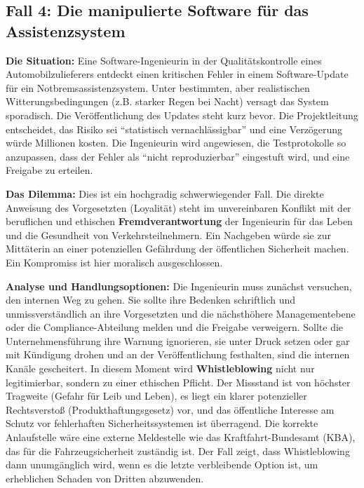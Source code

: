 \documentclass[
    12pt,               %
    a4paper,            %
    ngerman             %
]{scrartcl}
\begin{document}
\subsection{Fall 4: Die manipulierte Software für das Assistenzsystem}

\textbf{Die Situation:} Eine Software-Ingenieurin in der Qualitätskontrolle eines Automobilzulieferers entdeckt einen kritischen Fehler in einem Software-Update für ein Notbremsassistenzsystem. Unter bestimmten, aber realistischen Witterungsbedingungen (z.B. starker Regen bei Nacht) versagt das System sporadisch. Die Veröffentlichung des Updates steht kurz bevor. Die Projektleitung entscheidet, das Risiko sei \enquote{statistisch vernachlässigbar} und eine Verzögerung würde Millionen kosten. Die Ingenieurin wird angewiesen, die Testprotokolle so anzupassen, dass der Fehler als \enquote{nicht reproduzierbar} eingestuft wird, und eine Freigabe zu erteilen.

\textbf{Das Dilemma:} Dies ist ein hochgradig schwerwiegender Fall. Die direkte Anweisung des Vorgesetzten (Loyalität) steht im unvereinbaren Konflikt mit der beruflichen und ethischen \textbf{Fremdverantwortung} der Ingenieurin für das Leben und die Gesundheit von Verkehrsteilnehmern. Ein Nachgeben würde sie zur Mittäterin an einer potenziellen Gefährdung der öffentlichen Sicherheit machen. Ein Kompromiss ist hier moralisch ausgeschlossen.

\textbf{Analyse und Handlungsoptionen:} Die Ingenieurin muss zunächst versuchen, den internen Weg zu gehen. Sie sollte ihre Bedenken schriftlich und unmissverständlich an ihre Vorgesetzten und die nächsthöhere Managementebene oder die Compliance-Abteilung melden und die Freigabe verweigern. Sollte die Unternehmensführung ihre Warnung ignorieren, sie unter Druck setzen oder gar mit Kündigung drohen und an der Veröffentlichung festhalten, sind die internen Kanäle gescheitert. In diesem Moment wird \textbf{Whistleblowing} nicht nur legitimierbar, sondern zu einer ethischen Pflicht. Der Missstand ist von höchster Tragweite (Gefahr für Leib und Leben), es liegt ein klarer potenzieller Rechtsverstoß (Produkthaftungsgesetz) vor, und das öffentliche Interesse am Schutz vor fehlerhaften Sicherheitssystemen ist überragend. Die korrekte Anlaufstelle wäre eine externe Meldestelle wie das Kraftfahrt-Bundesamt (KBA), das für die Fahrzeugsicherheit zuständig ist. Der Fall zeigt, dass Whistleblowing dann unumgänglich wird, wenn es die letzte verbleibende Option ist, um erheblichen Schaden von Dritten abzuwenden.
\end{document}
